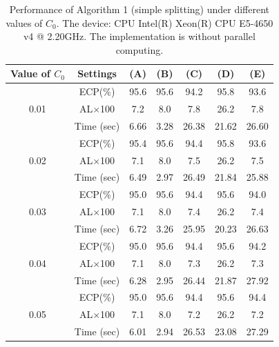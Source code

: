 \documentclass[11pt]{article}
\theoremstyle{referenceplain}
\theoremstyle{referencedefinition}
\theoremstyle{referenceremark}
\begin{document}
\begin{table}[H]
\centering
\scriptsize
\begin{tabular}{|c|c|c|c|c|c|c|}
\hline
Value of ${C_0}$        & Settings      & (A)  & (B)  & (C)   & (D)   & (E)   \\ \hline
\multirow{3}{*}{0.01} & ECP(\%)       & 95.6 & 95.6 & 94.2  & 95.8  & 93.6  \\ \cline{2-7} 
                      & AL$\times$100 & 7.2  & 8.0  & 7.8  & 26.2  & 7.8  \\ \cline{2-7} 
                      & Time (sec)    & 6.66 & 3.28 & 26.38 & 21.62 & 26.60 \\ \hline
\multirow{3}{*}{0.02} & ECP(\%)       & 95.4 & 95.6 & 94.4  & 95.8  & 93.6  \\ \cline{2-7} 
                      & AL$\times$100 & 7.1  & 8.0  & 7.5  & 26.2  & 7.5  \\ \cline{2-7} 
                      & Time (sec)    & 6.49 & 2.97 & 26.49 & 21.84 & 25.88 \\ \hline
\multirow{3}{*}{0.03} & ECP(\%)       & 95.0 & 95.6 & 94.4  & 95.6  & 94.0  \\ \cline{2-7} 
                      & AL$\times$100 & 7.1  & 8.0  & 7.4  & 26.2  & 7.4  \\ \cline{2-7} 
                      & Time (sec)    & 6.72 & 3.26 & 25.95 & 20.23 & 26.63 \\ \hline
\multirow{3}{*}{0.04} & ECP(\%)       & 95.0 & 95.6 & 94.4  & 95.6  & 94.2  \\ \cline{2-7} 
                      & AL$\times$100 & 7.1  & 8.0  & 7.3  & 26.2  & 7.3  \\ \cline{2-7} 
                      & Time (sec)    & 6.28 & 2.95 & 26.44 & 21.87 & 27.92 \\ \hline
\multirow{3}{*}{0.05} & ECP(\%)       & 95.0 & 95.6 & 94.4  & 95.6  & 94.4  \\ \cline{2-7} 
                      & AL$\times$100 & 7.1  & 8.0  & 7.2  & 26.2  & 7.2  \\ \cline{2-7} 
                      & Time (sec)    & 6.01 & 2.94 & 26.53 & 23.08 & 27.29 \\ \hline
\end{tabular}
\caption{Performance of Algorithm 1 (simple splitting) under different values of ${C_0}$. The device: CPU Intel(R) Xeon(R) CPU E5-4650 v4 @ 2.20GHz. The implementation is without parallel computing.}
\label{tab4}
\end{table}
\end{document}
